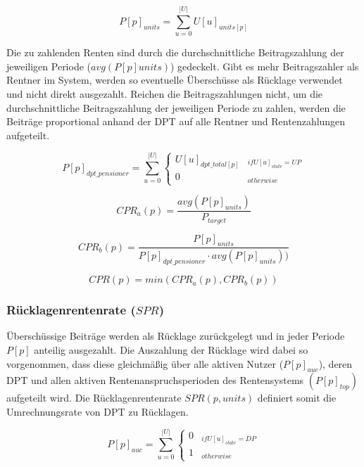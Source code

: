 \begin{equation}
P[p]_{units} = \sum_{u=0}^{|U|} U[u]_{units[p]}
\end{equation}

Die zu zahlenden Renten sind durch die durchschnittliche Beitragszahlung der 
jeweiligen Periode ($avg(P[p]units)$) gedeckelt. Gibt es mehr Beitragszahler als Rentner im System, werden so eventuelle Überschüsse als Rücklage verwendet und nicht direkt ausgezahlt. Reichen die Beitragszahlungen nicht, um die durchschnittliche Beitragszahlung der 
jeweiligen Periode zu zahlen, werden die Beiträge proportional anhand der DPT auf alle Rentner und Rentenzahlungen  aufgeteilt.

\begin{dmath}
P[p]_{dpt\_pensioner} = 
\sum_{u=0}^{|U|} \begin{cases} 
U[u]_{dpt\_total[p]} & _{if U[u]_{state} = UP}\\
0 & _{otherwise}
\end{cases}
\end{dmath}

\begin{equation*}
CPR_{a}(p) = \frac{avg(P[p]_{units})}{P_{target}}
\end{equation*}

\begin{equation*}
CPR_{b}(p) = \frac{P[p]_{units}} {P[p]_{dpt\_pensioner} \cdot avg(P[p]_{units}))}
\end{equation*}

\begin{equation}
CPR(p) = min(CPR_{a}(p), CPR_{b}(p))
\end{equation}


\subsubsection*{Rücklagenrentenrate ($SPR$)}

Überschüssige Beiträge werden als Rücklage zurückgelegt und in jeder Periode $P[p]$ anteilig ausgezahlt. Die Auszahlung der Rücklage wird dabei so vorgenommen, dass diese gleichmäßig über alle aktiven Nutzer  ($P[p]_{auc}$), deren DPT und allen aktiven Rentenanspruchsperioden des Rentensystems $(P[p]_{top})$ aufgeteilt wird. Die Rücklagenrentenrate $SPR(p, units)$ definiert somit die Umrechnungsrate von DPT zu Rücklagen.


\begin{equation}
P[p]_{auc} = \sum_{u=0}^{|U|} \begin{cases} 
0 & _{if U[u]_{state} = DP}\\
1 & _{otherwise}
\end{cases}
\end{equation}

